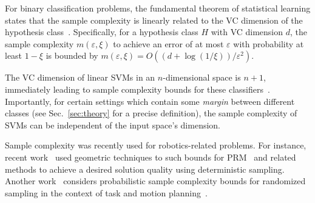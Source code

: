 For binary classification problems, the fundamental theorem of statistical learning states that the sample complexity is linearly related to the VC dimension of the hypothesis class~\cite{shalev2014understanding}. 
Specifically, for a hypothesis class $H$ with VC dimension $d$, the sample complexity $m(\varepsilon, \xi)$ to achieve an error of at most $\varepsilon$ with probability at least $1-\xi$ is bounded by 
$
m(\varepsilon, \xi) = O\left({(d + \log(1/\xi))} / {\varepsilon^2}\right)
$.

The VC dimension of linear SVMs in an $n$-dimensional space is $n+1$, immediately leading to sample complexity bounds for these classifiers~\cite{shalev2014understanding}.
%
Importantly, for certain  settings which contain some \emph{margin} between different classes (see Sec.~\ref{sec:theory} for a precise definition), the sample complexity of SVMs can be independent of the input space's dimension.

Sample complexity was recently used for robotics-related problems.
%
For instance, recent work~\cite{TsaoSP20, DayanSPH23}  used geometric techniques to such  bounds for PRM~\cite{kavraki1996probabilistic} and related methods to achieve a desired solution quality using deterministic sampling. Another work~\cite{shaw2024practicalfinitesamplebounds} considers probabilistic sample complexity bounds for randomized sampling in the context of task and motion planning~\cite{garrett2021integrated}.


